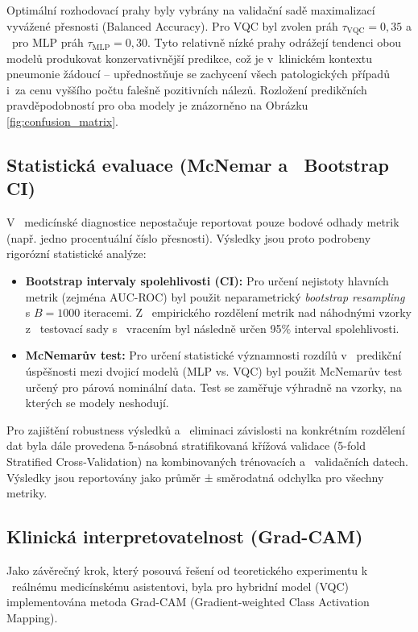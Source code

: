 \documentclass[12pt, a4paper]{report}
\begin{document}
Optimální rozhodovací prahy byly vybrány na validační sadě maximalizací vyvážené přesnosti (Balanced Accuracy). Pro VQC byl zvolen práh $\tau_{\text{VQC}} = 0{,}35$ a ~pro MLP práh $\tau_{\text{MLP}} = 0{,}30$. Tyto relativně nízké prahy odrážejí tendenci obou modelů produkovat konzervativnější predikce, což je v~klinickém kontextu pneumonie žádoucí -- upřednostňuje se zachycení všech patologických případů i~za cenu vyššího počtu falešně pozitivních nálezů. Rozložení predikčních pravděpodobností pro oba modely je znázorněno na Obrázku \ref{fig:confusion_matrix}.

\subsection{Statistická evaluace (McNemar a ~Bootstrap CI)}
V ~medicínské diagnostice nepostačuje reportovat pouze bodové odhady metrik (např. jedno procentuální číslo přesnosti). Výsledky jsou proto podrobeny rigorózní statistické analýze:
\begin{itemize}
    \item \textbf{Bootstrap intervaly spolehlivosti (CI):} Pro určení nejistoty hlavních metrik (zejména AUC-ROC) byl použit neparametrický \textit{bootstrap resampling} s $B = 1000$ iteracemi. Z ~empirického rozdělení metrik nad náhodnými vzorky z ~testovací sady s ~vracením byl následně určen 95\% interval spolehlivosti.
    \item \textbf{McNemarův test:} Pro určení statistické významnosti rozdílů v ~predikční úspěšnosti mezi dvojicí modelů (MLP vs. VQC) byl použit McNemarův test určený pro párová nominální data. Test se zaměřuje výhradně na vzorky, na kterých se modely neshodují.
\end{itemize}

Pro zajištění robustness výsledků a ~eliminaci závislosti na konkrétním rozdělení dat byla dále provedena 5-násobná stratifikovaná křížová validace (5-fold Stratified Cross-Validation) na kombinovaných trénovacích a ~validačních datech. Výsledky jsou reportovány jako průměr ± směrodatná odchylka pro všechny metriky.

\subsection{Klinická interpretovatelnost (Grad-CAM)}
Jako závěrečný krok, který posouvá řešení od teoretického experimentu k ~reálnému medicínskému asistentovi, byla pro hybridní model (VQC) implementována metoda Grad-CAM (Gradient-weighted Class Activation Mapping).
\end{document}
